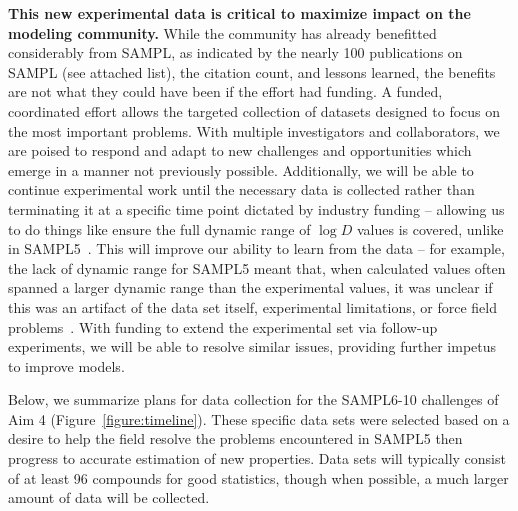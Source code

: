 \documentclass[11pt]{article}
\begin{document}
\textbf{This new experimental data is critical to maximize impact on the modeling community.} 
While the community has already benefitted considerably from SAMPL, as indicated by the nearly 100 publications on SAMPL (see attached list), the citation count, and lessons learned, the benefits are not what they could have been if the effort had funding.
A funded, coordinated effort allows the targeted collection of datasets designed to focus on the most important problems. 
With multiple investigators and collaborators, we are poised to respond and adapt to new challenges and opportunities which emerge in a manner not previously possible.
Additionally, we will be able to continue experimental work until the necessary data is collected rather than terminating it at a specific time point dictated by industry funding -- allowing us to do things like ensure the full dynamic range of $\log D$ values is covered, unlike in SAMPL5~\cite{rustenburg_measuring_2016, bannan_blind_2016}.
This will improve our ability to learn from the data -- for example, the lack of dynamic range for SAMPL5 meant that, when calculated values often spanned a larger dynamic range than the experimental values, it was unclear if this was an artifact of the data set itself, experimental limitations, or force field problems~\cite{rustenburg_measuring_2016, bannan_blind_2016, paranahewage_predicting_2016, klamt_prediction_2016}. 
With funding to extend the experimental set via follow-up experiments, we will be able to resolve similar issues, providing further impetus to improve models.

Below, we summarize plans for data collection for the SAMPL6-10 challenges of Aim 4 (Figure~\ref{figure:timeline}).
These specific data sets were selected based on a desire to help the field resolve the problems encountered in SAMPL5 then progress to accurate estimation of new properties.
Data sets will typically consist of at least 96 compounds for good statistics, though when possible, a much larger amount of data will be collected.
\end{document}
